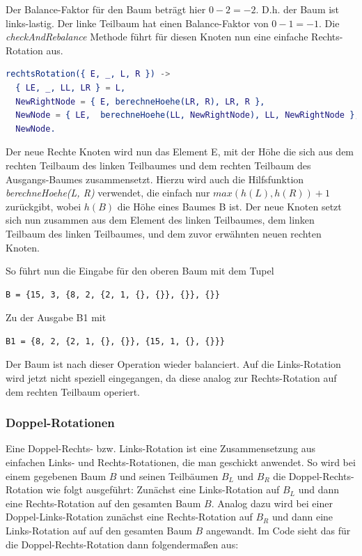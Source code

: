 \documentclass{article}
\begin{document}
	Der Balance-Faktor für den Baum beträgt hier $0 - 2 = -2$. D.h. der Baum ist links-lastig. Der linke Teilbaum hat einen Balance-Faktor von $0 - 1 = -1$. Die \textit{checkAndRebalance} Methode führt für diesen Knoten nun eine einfache Rechts-Rotation aus.
	
	\begin{lstlisting}[language=erlang]
rechtsRotation({ E, _, L, R }) ->
  { LE, _, LL, LR } = L,
  NewRightNode = { E, berechneHoehe(LR, R), LR, R },
  NewNode = { LE,  berechneHoehe(LL, NewRightNode), LL, NewRightNode },
  NewNode.
	\end{lstlisting}
  
  	Der neue Rechte Knoten wird nun das Element E, mit der Höhe die sich aus dem rechten Teilbaum des linken Teilbaumes und dem rechten Teilbaum des Ausgangs-Baumes zusammensetzt. Hierzu wird auch die Hilfsfunktion \textit{berechneHoehe(L, R)} verwendet, die einfach nur $max(h(L), h(R)) + 1$ zurückgibt, wobei $h(B)$ die Höhe eines Baumes B ist.
  	Der neue Knoten setzt sich nun zusammen aus dem Element des linken Teilbaumes, dem linken Teilbaum des linken Teilbaumes, und dem zuvor erwähnten neuen rechten Knoten.
  	
  	So führt nun die Eingabe für den oberen Baum mit dem Tupel 
  	\begin{lstlisting}
B = {15, 3, {8, 2, {2, 1, {}, {}}, {}}, {}}
  	\end{lstlisting}
	Zu der Ausgabe B1 mit 
	\begin{lstlisting}
B1 = {8, 2, {2, 1, {}, {}}, {15, 1, {}, {}}}
	\end{lstlisting}
  	
  	Der Baum ist nach dieser Operation wieder balanciert.
  	Auf die Links-Rotation wird jetzt nicht speziell eingegangen, da diese analog zur Rechts-Rotation auf dem rechten Teilbaum operiert.
  	
	\subsubsection{Doppel-Rotationen}
	
	Eine Doppel-Rechts- bzw. Links-Rotation ist eine Zusammensetzung aus einfachen Links- und Rechts-Rotationen, die man geschickt anwendet. So wird bei einem gegebenen Baum $B$ und seinen Teilbäumen $B_L$ und $B_R$ die Doppel-Rechts-Rotation wie folgt ausgeführt: Zunächst eine Links-Rotation auf $B_L$ und dann eine Rechts-Rotation auf den gesamten Baum $B$. Analog dazu wird bei einer Doppel-Links-Rotation zunächst eine Rechts-Rotation auf $B_R$ und dann eine Links-Rotation auf auf den gesamten Baum $B$ angewandt.
	Im Code sieht das für die Doppel-Rechts-Rotation dann folgendermaßen aus:
	
\end{document}

